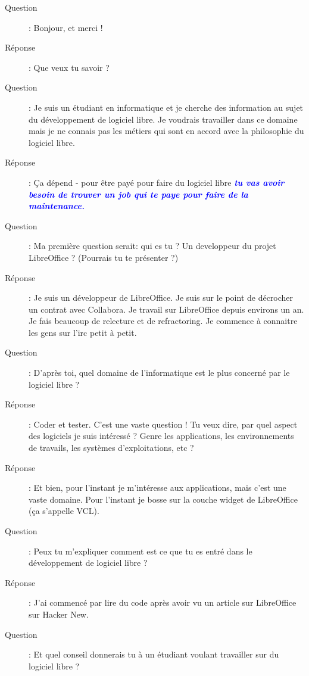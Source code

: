 \documentclass[a4paper,12pt, draft]{report}
\newcommand{\importantPoint}[1]{\textcolor{blue}{\textbf{\textit{#1}}}}
\begin{document}
\begin{description}
\item [Question]:  Bonjour, et merci !
\item [Réponse]:  Que veux tu savoir ?
\item [Question]:  Je suis un étudiant en informatique et je cherche des information au sujet du développement de logiciel libre. Je voudrais travailler dans ce domaine mais je ne connais pas les métiers qui sont en accord avec la philosophie du logiciel libre.
\item [Réponse]:  Ça dépend - pour être payé pour faire du logiciel libre \importantPoint{tu vas avoir besoin de trouver un job qui te paye pour faire de la maintenance.}
\item [Question]:  Ma première question serait: qui es tu ? Un developpeur du projet LibreOffice ? (Pourrais tu te présenter ?)
\item [Réponse]:  Je suis un développeur de LibreOffice. Je suis sur le point de décrocher un contrat avec Collabora. Je travail sur LibreOffice depuis environs un an. Je fais beaucoup de relecture et de refractoring. Je commence à connaitre les gens sur l'irc petit à petit.
\item [Question]:  D'après toi, quel domaine de l'informatique est le plus concerné par le logiciel libre ?
\item [Réponse]:  Coder et tester. C'est une vaste question ! Tu veux dire, par quel aspect des logiciels je suis intéressé ? Genre les applications, les environnements de travails, les systèmes d'exploitations, etc ?
\item [Réponse]:  Et bien, pour l'instant je m'intéresse aux applications, mais c'est une vaste domaine. Pour l'instant je bosse sur la couche widget de LibreOffice (ça s'appelle VCL).
\item [Question]: Peux tu m'expliquer comment est ce que tu es entré dans le développement de logiciel libre ?
\item [Réponse]:  J'ai commencé par lire du code après avoir vu un article sur LibreOffice sur Hacker New.
\item [Question]:  Et quel conseil donnerais tu à un étudiant voulant travailler sur du logiciel libre ?

\end{description}
\end{document}
